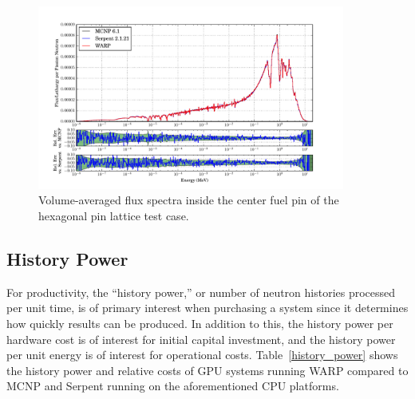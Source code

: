 \documentclass[preprint,12pt]{elsarticle}
\begin{document}
\begin{figure}[h!]
\centering
\includegraphics[width=0.9\textwidth,trim= 1cm 0cm 1cm 0cm]{graphics/assembly-lw_spec.pdf}
\caption{Volume-averaged flux spectra inside the center fuel pin of the hexagonal pin lattice test case. \label{assembly-lw_spec} }
\end{figure}

\newpage
\subsection{History Power}

For productivity, the ``history power,'' or  number of neutron histories processed per unit time, is of primary interest when purchasing a system since it determines how quickly results can be produced.  In addition to this, the history power per hardware cost is of interest for initial capital investment, and the history power per unit energy is of interest for operational costs.  Table~\ref{history_power} shows the history power and relative costs of GPU systems running WARP compared to MCNP and Serpent running on the aforementioned CPU platforms.  
\end{document}
